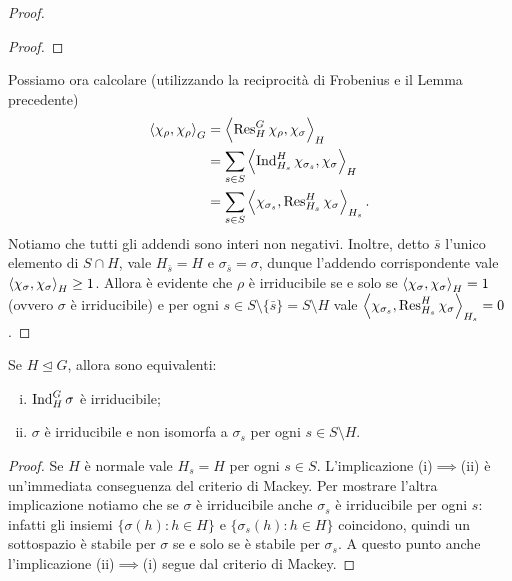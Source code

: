 \begin{proof}
\begin{proof}
\end{proof}
Possiamo ora calcolare (utilizzando la reciprocità di Frobenius e il Lemma precedente)
\begin{align*}
\left\langle\chi_\rho,\chi_\rho\right\rangle_G&=\left\langle\operatorname{Res}_H^G\chi_\rho,\chi_\sigma\right\rangle_H\\
&=\sum_{s\in S}\left\langle\operatorname{Ind}_{H_s}^H\chi_{\sigma_s},\chi_\sigma\right\rangle_H\\
&=\sum_{s\in S}\left\langle\chi_{\sigma_s},\operatorname{Res}_{H_s}^H\chi_\sigma\right\rangle_{H_s}.
\end{align*}
Notiamo che tutti gli addendi sono interi non negativi. Inoltre, detto $\bar{s}$ l'unico elemento di $S\cap H$, vale $H_{\bar{s}}=H$ e $\sigma_{\bar{s}}=\sigma$, dunque l'addendo corrispondente vale $\left\langle\chi_\sigma,\chi_\sigma\right\rangle_H\ge 1$. Allora è evidente che $\rho$ è irriducibile se e solo se $\left\langle\chi_\sigma,\chi_\sigma\right\rangle_H=1$ (ovvero $\sigma$ è irriducibile) e per ogni $s\in S\setminus\{\bar{s}\}=S\setminus H$ vale $\left\langle\chi_{\sigma_s},\operatorname{Res}_{H_s}^H\chi_\sigma\right\rangle_{H_s}=0$.
\end{proof}

\begin{corollary}
Se $H\trianglelefteq G$, allora sono equivalenti:
\begin{enumerate}[(i)]
\item $\operatorname{Ind}_H^G\sigma$ è irriducibile;
\item $\sigma$ è irriducibile e non isomorfa a $\sigma_s$ per ogni $s\in S\setminus H$.
\end{enumerate}
\end{corollary}
\begin{proof}
Se $H$ è normale vale $H_s=H$ per ogni $s\in S$. L'implicazione (i)$\implies$(ii) è un'immediata conseguenza del criterio di Mackey. Per mostrare l'altra implicazione notiamo che se $\sigma$ è irriducibile anche $\sigma_s$ è irriducibile per ogni $s$: infatti gli insiemi $\{\sigma(h):h\in H\}$ e $\{\sigma_s(h):h\in H\}$ coincidono, quindi un sottospazio è stabile per $\sigma$ se e solo se è stabile per $\sigma_s$. A questo punto anche l'implicazione (ii)$\implies$(i) segue dal criterio di Mackey.
\end{proof}

